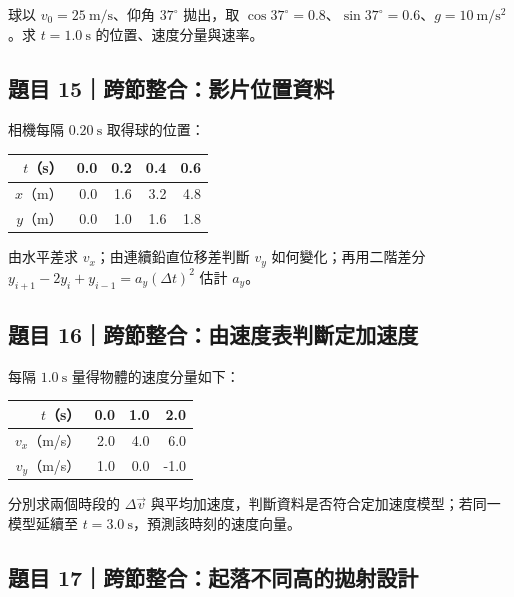 \documentclass[11pt,a4paper]{article}
\newcounter{none}
\begin{document}
球以 \(v_0=25\ \mathrm{m/s}\)、仰角 \(37^\circ\) 拋出，取 \(\cos37^\circ=0.8\)、\(\sin37^\circ=0.6\)、\(g=10\ \mathrm{m/s^2}\)。求 \(t=1.0\ \mathrm s\) 的位置、速度分量與速率。

\subsection{題目 15｜跨節整合：影片位置資料}\label{ux984cux76ee-15ux8de8ux7bc0ux6574ux5408ux5f71ux7247ux4f4dux7f6eux8cc7ux6599}

相機每隔 \(0.20\ \mathrm s\) 取得球的位置：

{\def\LTcaptype{none} %
\begin{longtable}[]{@{}rrrrr@{}}
\toprule\noalign{}
\(t\)（s） & 0.0 & 0.2 & 0.4 & 0.6 \\
\midrule\noalign{}
\endhead
\bottomrule\noalign{}
\endlastfoot
\(x\)（m） & 0.0 & 1.6 & 3.2 & 4.8 \\
\(y\)（m） & 0.0 & 1.0 & 1.6 & 1.8 \\
\end{longtable}
}

由水平差求 \(v_x\)；由連續鉛直位移差判斷 \(v_y\) 如何變化；再用二階差分 \(y_{i+1}-2y_i+y_{i-1}=a_y(\Delta t)^2\) 估計 \(a_y\)。

\subsection{題目 16｜跨節整合：由速度表判斷定加速度}\label{ux984cux76ee-16ux8de8ux7bc0ux6574ux5408ux7531ux901fux5ea6ux8868ux5224ux65b7ux5b9aux52a0ux901fux5ea6}

每隔 \(1.0\ \mathrm s\) 量得物體的速度分量如下：

{\def\LTcaptype{none} %
\begin{longtable}[]{@{}rrrr@{}}
\toprule\noalign{}
\(t\)（s） & 0.0 & 1.0 & 2.0 \\
\midrule\noalign{}
\endhead
\bottomrule\noalign{}
\endlastfoot
\(v_x\)（m/s） & 2.0 & 4.0 & 6.0 \\
\(v_y\)（m/s） & 1.0 & 0.0 & -1.0 \\
\end{longtable}
}

分別求兩個時段的 \(\Delta\vec v\) 與平均加速度，判斷資料是否符合定加速度模型；若同一模型延續至 \(t=3.0\ \mathrm s\)，預測該時刻的速度向量。

\subsection{題目 17｜跨節整合：起落不同高的拋射設計}\label{ux984cux76ee-17ux8de8ux7bc0ux6574ux5408ux8d77ux843dux4e0dux540cux9ad8ux7684ux62cbux5c04ux8a2dux8a08}
\end{document}
